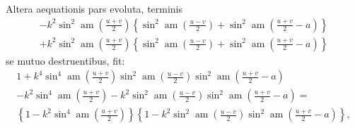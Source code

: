 \documentclass{article}
\begin{document}
Altera aequationis pars evoluta, terminis
\[
\begin{gathered}
-k^{2}\sin^{2}\operatorname{am}\left(\frac{u+v}{2}\right)\left\{\sin^{2}\operatorname{am}\left(\frac{u-v}{2}\right)+\sin^{2}\operatorname{am}\left(\frac{u+v}{2}-a\right)\right\}\\[1.5ex]
+k^{2}\sin^{2}\operatorname{am}\left(\frac{u+v}{2}\right)\left\{\sin^{2}\operatorname{am}\left(\frac{u-v}{2}\right)+\sin^{2}\operatorname{am}\left(\frac{u+v}{2}-a\right)\right\}
\end{gathered}
\]
se mutuo destruentibus, fit:
\[
\begin{gathered}
1+k^{4}\sin^{4}\operatorname{am}\left(\frac{u+v}{2}\right)\sin^{2}\operatorname{am}\left(\frac{u-v}{2}\right)\sin^{2}\operatorname{am}\left(\frac{u+v}{2}-a\right)\\[1.5ex]
-k^{2}\sin^{4}\operatorname{am}\left(\frac{u+v}{2}\right)-k^{2}\sin^{2}\operatorname{am}\left(\frac{u-v}{2}\right)\sin^{2}\operatorname{am}\left(\frac{u+v}{2}-a\right)=\\[1.5ex]
\left\{1-k^{2}\sin^{4}\operatorname{am}\left(\frac{u+v}{2}\right)\right\}\left\{1-k^{2}\sin^{2}\operatorname{am}\left(\frac{u-v}{2}\right)\sin^{2}\operatorname{am}\left(\frac{u+v}{2}-a\right)\right\},
\end{gathered}
\]
\end{document}
